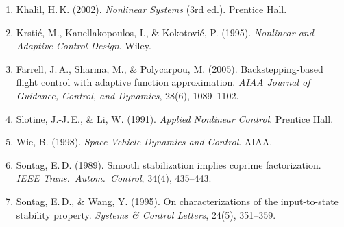 \documentclass[11pt,a4paper]{article}
\theoremstyle{plain}
\theoremstyle{remark}
\begin{document}
\begin{enumerate}
  \item Khalil, H.\,K. (2002). \textit{Nonlinear Systems} (3rd ed.). Prentice Hall.
  \item Krsti\'{c}, M., Kanellakopoulos, I., \& Kokotovi\'{c}, P. (1995). \textit{Nonlinear and Adaptive Control Design}. Wiley.
  \item Farrell, J.\,A., Sharma, M., \& Polycarpou, M. (2005). Backstepping-based flight control with adaptive function approximation. \textit{AIAA Journal of Guidance, Control, and Dynamics}, 28(6), 1089--1102.
  \item Slotine, J.-J.\,E., \& Li, W. (1991). \textit{Applied Nonlinear Control}. Prentice Hall.
  \item Wie, B. (1998). \textit{Space Vehicle Dynamics and Control}. AIAA.
  \item Sontag, E.\,D. (1989). Smooth stabilization implies coprime factorization. \textit{IEEE Trans.\ Autom.\ Control}, 34(4), 435--443.
  \item Sontag, E.\,D., \& Wang, Y. (1995). On characterizations of the input-to-state stability property. \textit{Systems \& Control Letters}, 24(5), 351--359.
\end{enumerate}
\end{document}
